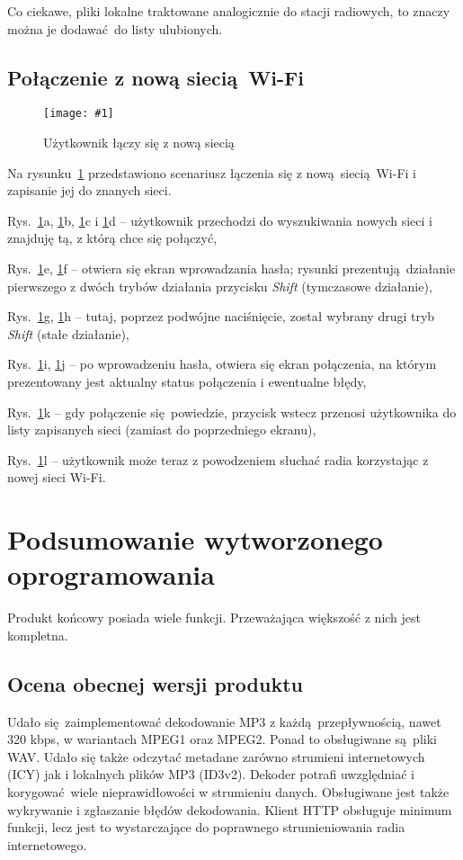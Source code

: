 \documentclass[polish]{aghengthesis}
\let\tempone\itemize
\let\temptwo\enditemize
\renewenvironment{itemize}{\tempone\setlength{\itemsep}{0cm}}{\temptwo}
\newcommand{\imgint}[4]{
	\begin{figure}[{#4}]
		\centering
		\texttt{[image: \#1]}
		\caption{#2}
		\label{#1}
	\end{figure}
}
\newcommand{\imgh}[3]{\imgint{#1}{#2}{#3}{H}}
\begin{document}
			Co ciekawe, pliki lokalne traktowane analogicznie do stacji radiowych, to znaczy można je dodawać do listy ulubionych.
			
		\subsection{Połączenie z nową siecią Wi-Fi}
			\imgh{5/PicoRadio-fl-wifi}{Użytkownik łączy się z nową siecią}{0.9}
			\newcommand{\rflwifi}[1]{\ref{5/PicoRadio-fl-wifi}#1}
			
			Na rysunku~\rflwifi{} przedstawiono scenariusz łączenia się z nową siecią Wi-Fi i zapisanie jej do znanych sieci.
			
			\begin{itemize}
				\item Rys.~\rflwifi{a}, \rflwifi{b}, \rflwifi{c} i \rflwifi{d} -- użytkownik przechodzi do wyszukiwania nowych sieci i znajduję tą, z którą chce się połączyć,
				\item Rys.~\rflwifi{e}, \rflwifi{f} -- otwiera się ekran wprowadzania hasła; rysunki prezentują działanie pierwszego z dwóch trybów działania przycisku \textit{Shift} (tymczasowe działanie),
				\item Rys.~\rflwifi{g}, \rflwifi{h} -- tutaj, poprzez podwójne naciśnięcie, został wybrany drugi tryb \textit{Shift} (stałe działanie),
				\item Rys.~\rflwifi{i}, \rflwifi{j} -- po wprowadzeniu hasła, otwiera się ekran połączenia, na którym prezentowany jest aktualny status połączenia i ewentualne błędy,
				\item Rys.~\rflwifi{k} -- gdy połączenie się powiedzie, przycisk wstecz przenosi użytkownika do listy zapisanych sieci (zamiast do poprzedniego ekranu),
				\item Rys.~\rflwifi{l} -- użytkownik może teraz z powodzeniem słuchać radia korzystając z nowej sieci Wi-Fi.
			\end{itemize}
			
	\section{Podsumowanie wytworzonego oprogramowania}
		Produkt końcowy posiada wiele funkcji. Przeważająca większość z nich jest kompletna.
		
		\subsection{Ocena obecnej wersji produktu}
			Udało się zaimplementować dekodowanie MP3 z każdą przepływnością, nawet 320 kbps, w wariantach MPEG1 oraz MPEG2. Ponad to obsługiwane są pliki WAV. Udało się także odczytać metadane zarówno strumieni internetowych (ICY) jak i lokalnych plików MP3 (ID3v2). Dekoder potrafi uwzględniać i korygować wiele nieprawidłowości w strumieniu danych. Obsługiwane jest także wykrywanie i zgłaszanie błędów dekodowania. Klient HTTP obsługuje minimum funkcji, lecz jest to wystarczające do poprawnego strumieniowania radia internetowego.
			$ $\\
			
\end{document}
